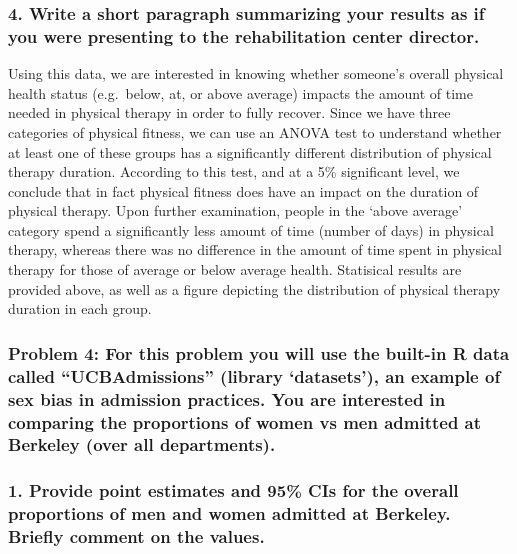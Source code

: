 \documentclass[]{article}
\begin{document}
\subsubsection{4. Write a short paragraph summarizing your results as if
you were presenting to the rehabilitation center
director.}\label{write-a-short-paragraph-summarizing-your-results-as-if-you-were-presenting-to-the-rehabilitation-center-director.}

Using this data, we are interested in knowing whether someone's overall
physical health status (e.g.~below, at, or above average) impacts the
amount of time needed in physical therapy in order to fully recover.
Since we have three categories of physical fitness, we can use an ANOVA
test to understand whether at least one of these groups has a
significantly different distribution of physical therapy duration.
According to this test, and at a 5\% significant level, we conclude that
in fact physical fitness does have an impact on the duration of physical
therapy. Upon further examination, people in the `above average'
category spend a significantly less amount of time (number of days) in
physical therapy, whereas there was no difference in the amount of time
spent in physical therapy for those of average or below average health.
Statisical results are provided above, as well as a figure depicting the
distribution of physical therapy duration in each group.

\newpage  

\subsubsection{\texorpdfstring{Problem 4: For this problem you will use
the built-in R data called ``UCBAdmissions'' (library `datasets'), an
example of sex bias in admission practices. You are interested in
comparing the proportions of women vs men admitted at Berkeley (over all
departments).}{Problem 4: For this problem you will use the built-in R data called UCBAdmissions (library datasets), an example of sex bias in admission practices. You are interested in comparing the proportions of women vs men admitted at Berkeley (over all departments).}}\label{problem-4-for-this-problem-you-will-use-the-built-in-r-data-called-ucbadmissions-library-datasets-an-example-of-sex-bias-in-admission-practices.-you-are-interested-in-comparing-the-proportions-of-women-vs-men-admitted-at-berkeley-over-all-departments.}

\subsubsection{1. Provide point estimates and 95\% CIs for the overall
proportions of men and women admitted at Berkeley. Briefly comment on
the
values.}\label{provide-point-estimates-and-95-cis-for-the-overall-proportions-of-men-and-women-admitted-at-berkeley.-briefly-comment-on-the-values.}
\end{document}
